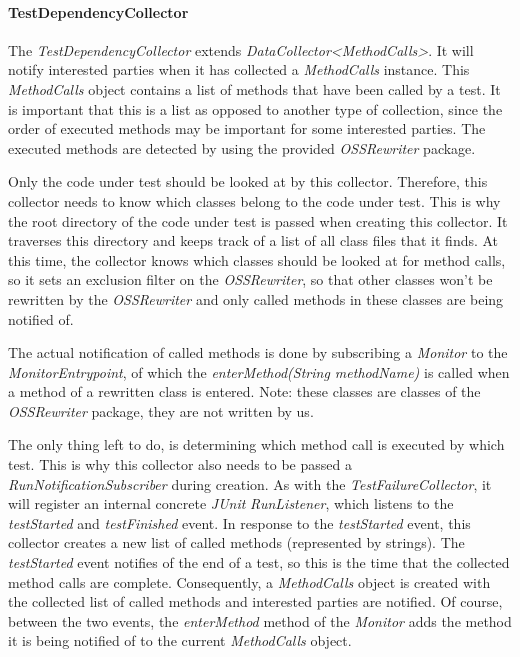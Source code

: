 \documentclass[i2]{oss}
\newcommand{\class}[1]{\emph{#1}}
\newcommand{\method}[1]{\emph{#1}}
\newcommand{\junit}{\emph{JUnit }}
\begin{document}
\paragraph{TestDependencyCollector} The \class{TestDependencyCollector} extends \class{DataCollector<MethodCalls>}.
It will notify interested parties when it has collected a \class{MethodCalls} instance.
This \class{MethodCalls} object contains a list of methods that have been called by a test.
It is important that this is a list as opposed to another type of collection, since the order of executed methods may be important for some interested parties.
The executed methods are detected by using the provided \class{OSSRewriter} package.

Only the code under test should be looked at by this collector.
Therefore, this collector needs to know which classes belong to the code under test.
This is why the root directory of the code under test is passed when creating this collector.
It traverses this directory and keeps track of a list of all class files that it finds.
At this time, the collector knows which classes should be looked at for method calls, so it sets an exclusion filter on the \class{OSSRewriter}, so that other classes won't be rewritten by the \class{OSSRewriter} and only called methods in these classes are being notified of.

The actual notification of called methods is done by subscribing a \class{Monitor} to the \class{MonitorEntrypoint}, of which the \method{enterMethod(String methodName)} is called when a method of a rewritten class is entered. Note: these classes are classes of the \class{OSSRewriter} package, they are not written by us.

The only thing left to do, is determining which method call is executed by which test.
This is why this collector also needs to be passed a \class{RunNotificationSubscriber} during creation.
As with the \class{TestFailureCollector}, it will register an internal concrete \junit \class{RunListener}, which listens to the \emph{testStarted} and \emph{testFinished} event.
In response to the \emph{testStarted} event, this collector creates a new list of called methods (represented by strings).
The \emph{testStarted} event notifies of the end of a test, so this is the time that the collected method calls are complete. Consequently, a \class{MethodCalls} object is created with the collected list of called methods and interested parties are notified.
Of course, between the two events, the \method{enterMethod} method of the \class{Monitor} adds the method it is being notified of to the current \class{MethodCalls} object.
\end{document}
